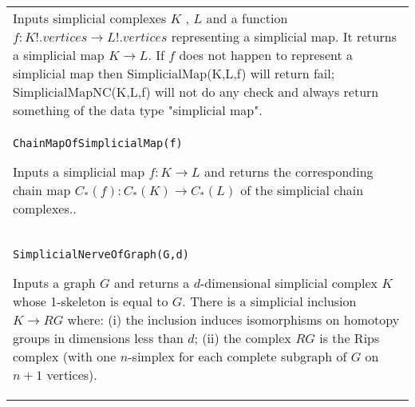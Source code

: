 \documentclass[a4paper,11pt]{report}
\begin{document}
{\begin{center}
\begin{tabular}{|l|}
 Inputs simplicial complexes $K$ , $L$ and a function $f\colon K!.vertices \rightarrow L!.vertices$ representing a simplicial map. It returns a simplicial map $K \rightarrow L$. If $f$ does not happen to represent a simplicial map then SimplicialMap(K,L,f) will
return fail; SimplicialMapNC(K,L,f) will not do any check and always return
something of the data type "simplicial map". \\
 \index{ChainMapOfSimplicialMap} \texttt{ChainMapOfSimplicialMap(f)} 

 Inputs a simplicial map $f\colon K \rightarrow L$ and returns the corresponding chain map $C_\ast(f) \colon C_\ast(K) \rightarrow C_\ast(L)$ of the simplicial chain complexes.. \\
 \index{SimplicialNerveOfGraph} \texttt{SimplicialNerveOfGraph(G,d)} 

 Inputs a graph $G$ and returns a $d$-dimensional simplicial complex $K$ whose 1-skeleton is equal to $G$. There is a simplicial inclusion $K \rightarrow RG$ where: (i) the inclusion induces isomorphisms on homotopy groups in dimensions
less than $d$; (ii) the complex $RG$ is the Rips complex (with one $n$-simplex for each complete subgraph of $G$ on $n+1$ vertices). \\
\end{tabular}\\[2mm]
\end{center}

 }

 
\end{document}
